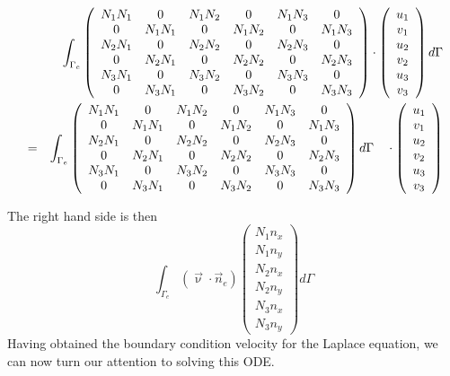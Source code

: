 \begin{eqnarray}
&&\int_{\Gamma_e} 
\left( \begin{array}{cccccc}  
N_1N_1 & 0 & N_1N_2 & 0 & N_1N_3 & 0 \\ 
0 & N_1N_1 & 0 & N_1N_2 & 0 & N_1N_3 \\
N_2N_1 & 0 & N_2N_2 & 0 & N_2N_3 & 0 \\ 
0 & N_2N_1 & 0 & N_2N_2 & 0 & N_2N_3 \\
N_3N_1 & 0 & N_3N_2 & 0 & N_3N_3 & 0 \\ 
0 & N_3N_1 & 0 & N_3N_2 & 0 & N_3N_3 \\
\end{array}\right)
\cdot \left( \begin{array}{c} u_1 \\ v_1 \\ u_2 \\ v_2 \\ u_3 \\ v_3 \end{array} \right) 
d\Gamma \nonumber\\ 
&=&
\int_{\Gamma_e} 
\left( \begin{array}{cccccc}  
N_1N_1 & 0 & N_1N_2 & 0 & N_1N_3 & 0 \\ 
0 & N_1N_1 & 0 & N_1N_2 & 0 & N_1N_3 \\
N_2N_1 & 0 & N_2N_2 & 0 & N_2N_3 & 0 \\ 
0 & N_2N_1 & 0 & N_2N_2 & 0 & N_2N_3 \\
N_3N_1 & 0 & N_3N_2 & 0 & N_3N_3 & 0 \\ 
0 & N_3N_1 & 0 & N_3N_2 & 0 & N_3N_3 
\end{array}\right)
d\Gamma \quad 
\cdot \left( \begin{array}{c} u_1 \\ v_1 \\ u_2 \\ v_2 \\ u_3 \\ v_3 \end{array} \right) 
\end{eqnarray}

The right hand side is then  
\[
\int_{\Gamma_e}   (\vec{\upnu}\cdot\vec{n}_e)
\left(\begin{array}{c}
N_1 n_x \\ N_1 n_y \\ 
N_2 n_x \\ N_2 n_y \\
N_3 n_x \\ N_3 n_y 
\end{array}\right)
 d\Gamma
\]
Having obtained the boundary condition velocity for the Laplace equation, we can now turn our attention 
to solving this ODE. 


